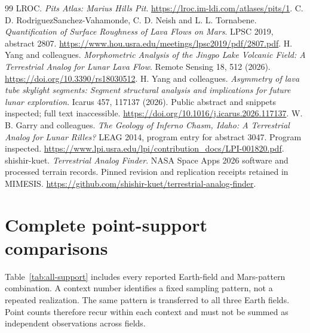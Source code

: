 \documentclass{article}
\begin{document}
\begin{thebibliography}{99}
 LROC. \emph{Pits Atlas: Marius Hills Pit}. \url{https://lroc.im-ldi.com/atlases/pits/1}.
 C. D. RodriguezSanchez-Vahamonde, C. D. Neish and L. L. Tornabene. \emph{Quantification of Surface Roughness of Lava Flows on Mars}. LPSC 2019, abstract 2807. \url{https://www.hou.usra.edu/meetings/lpsc2019/pdf/2807.pdf}.
 H. Yang and colleagues. \emph{Morphometric Analysis of the Jingpo Lake Volcanic Field: A Terrestrial Analog for Lunar Lava Flow}. Remote Sensing 18, 512 (2026). \url{https://doi.org/10.3390/rs18030512}.
 H. Yang and colleagues. \emph{Asymmetry of lava tube skylight segments: Segment structural analysis and implications for future lunar exploration}. Icarus 457, 117137 (2026). Public abstract and snippets inspected; full text inaccessible. \url{https://doi.org/10.1016/j.icarus.2026.117137}.
 W. B. Garry and colleagues. \emph{The Geology of Inferno Chasm, Idaho: A Terrestrial Analog for Lunar Rilles?} LEAG 2014, program entry for abstract 3047. Program inspected. \url{https://www.lpi.usra.edu/lpi/contribution_docs/LPI-001820.pdf}.
 shishir-kuet. \emph{Terrestrial Analog Finder}. NASA Space Apps 2026 software and processed terrain records. Pinned revision and replication receipts retained in MIMESIS. \url{https://github.com/shishir-kuet/terrestrial-analog-finder}.
\end{thebibliography}
\endgroup

\clearpage
\appendix
\section{Complete point-support comparisons}
\label{app:support}
Table~\ref{tab:all-support} includes every reported Earth-field and Mars-pattern combination. A context number identifies a fixed sampling pattern, not a repeated realization. The same pattern is transferred to all three Earth fields. Point counts therefore recur within each context and must not be summed as independent observations across fields.
\end{document}

